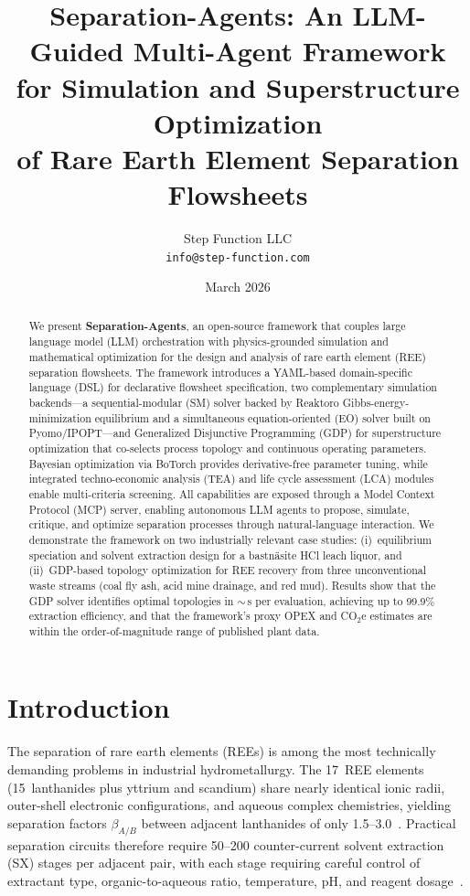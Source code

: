 \documentclass[11pt]{article}
\title{Separation-Agents: An LLM-Guided Multi-Agent Framework\\
  for Simulation and Superstructure Optimization\\
  of Rare Earth Element Separation Flowsheets}
\author{
  Step Function LLC \\
  \texttt{info@step-function.com}
}
\date{March 2026}
\begin{document}
\maketitle

\begin{abstract}
We present \textbf{Separation-Agents}, an open-source framework that couples
large language model (LLM) orchestration with physics-grounded simulation
and mathematical optimization for the design and analysis of rare earth
element (REE) separation flowsheets.  The framework introduces a
YAML-based domain-specific language (DSL) for declarative flowsheet
specification, two complementary simulation backends---a
sequential-modular (SM) solver backed by Reaktoro Gibbs-energy-minimization
equilibrium and a simultaneous equation-oriented (EO) solver built on
Pyomo/IPOPT---and Generalized Disjunctive Programming (GDP) for
superstructure optimization that co-selects process topology and continuous
operating parameters.  Bayesian optimization via BoTorch provides
derivative-free parameter tuning, while integrated techno-economic analysis
(TEA) and life cycle assessment (LCA) modules enable multi-criteria
screening.  All capabilities are exposed through a Model Context Protocol
(MCP) server, enabling autonomous LLM agents to propose, simulate, critique,
and optimize separation processes through natural-language interaction.  We
demonstrate the framework on two industrially relevant case studies:
(i)~equilibrium speciation and solvent extraction design for a bastn\"asite
HCl leach liquor, and (ii)~GDP-based topology optimization for REE recovery
from three unconventional waste streams (coal fly ash, acid mine drainage,
and red mud).  Results show that the GDP solver identifies optimal
topologies in $\sim$\,s per evaluation, achieving up to 99.9\%
extraction efficiency, and that the framework's proxy OPEX and CO$_2$e
estimates are within the order-of-magnitude range of published plant data.
\end{abstract}

\section{Introduction}\label{sec:intro}

The separation of rare earth elements (REEs) is among the most technically
demanding problems in industrial hydrometallurgy.  The 17~REE elements
(15~lanthanides plus yttrium and scandium) share nearly identical ionic
radii, outer-shell electronic configurations, and aqueous complex
chemistries, yielding separation factors $\beta_{A/B}$ between adjacent
lanthanides of only 1.5--3.0~\citep{xie2014critical}.  Practical separation
circuits therefore require 50--200 counter-current solvent extraction (SX)
stages per adjacent pair, with each stage requiring careful control of
extractant type, organic-to-aqueous ratio, temperature, pH, and reagent
dosage~\citep{gupta2005extractive}.
\end{document}
